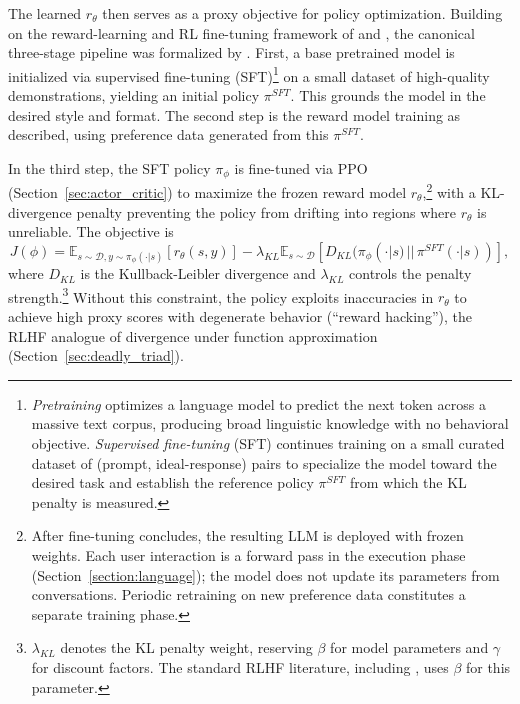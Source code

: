 The learned $r_\theta$ then serves as a proxy objective for policy optimization. Building on the reward-learning and RL fine-tuning framework of \citet{ziegler2019fine} and \citet{stiennon2020learning}, the canonical three-stage pipeline was formalized by \citet{ouyang2022training}. First, a base pretrained model is initialized via supervised fine-tuning (SFT)\footnote{\emph{Pretraining} optimizes a language model to predict the next token across a massive text corpus, producing broad linguistic knowledge with no behavioral objective. \emph{Supervised fine-tuning} (SFT) continues training on a small curated dataset of (prompt, ideal-response) pairs to specialize the model toward the desired task and establish the reference policy $\pi^{SFT}$ from which the KL penalty is measured.} on a small dataset of high-quality demonstrations, yielding an initial policy $\pi^{SFT}$. This grounds the model in the desired style and format. The second step is the reward model training as described, using preference data generated from this $\pi^{SFT}$.

In the third step, the SFT policy $\pi_\phi$ is fine-tuned via PPO (Section~\ref{sec:actor_critic}) to maximize the frozen reward model $r_\theta$,\footnote{After fine-tuning concludes, the resulting LLM is deployed with frozen weights. Each user interaction is a forward pass in the execution phase (Section~\ref{section:language}); the model does not update its parameters from conversations. Periodic retraining on new preference data constitutes a separate training phase.} with a KL-divergence penalty preventing the policy from drifting into regions where $r_\theta$ is unreliable. The objective is
\begin{equation}
    J(\phi) = \mathbb{E}_{s \sim \mathcal{D}, y \sim \pi_\phi(\cdot|s)} [r_\theta(s, y)] - \lambda_{KL} \mathbb{E}_{s \sim \mathcal{D}} [D_{KL}(\pi_\phi(\cdot|s) \,||\, \pi^{SFT}(\cdot|s))],
\label{eq:rlhf_objective}
\end{equation}
where $D_{KL}$ is the Kullback-Leibler divergence and $\lambda_{KL}$ controls the penalty strength.\footnote{$\lambda_{KL}$ denotes the KL penalty weight, reserving $\beta$ for model parameters and $\gamma$ for discount factors. The standard RLHF literature, including \citet{rafailov2023direct}, uses $\beta$ for this parameter.} Without this constraint, the policy exploits inaccuracies in $r_\theta$ to achieve high proxy scores with degenerate behavior (``reward hacking''), the RLHF analogue of divergence under function approximation (Section~\ref{sec:deadly_triad}).

